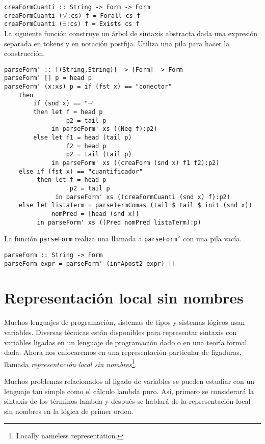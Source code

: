 \documentclass{article}
\begin{document}
\texttt{creaFormCuanti :: String -> Form -> Form}\\
\texttt{creaFormCuanti ($\forall$:cs) f = Forall cs f}\\
\texttt{creaFormCuanti ($\exists$:cs) f = Exists cs f}\\

La siguiente función construye un árbol de sintaxis abstracta dada una expresión separada en tokens y en notación postfija. Utiliza una pila para hacer la construcción.

\begin{verbatim}
parseForm' :: [(String,String)] -> [Form] -> Form
parseForm' [] p = head p
parseForm' (x:xs) p = if (fst x) == "conector"
    then
        if (snd x) == "¬"
        then let f = head p
                 p2 = tail p
             in parseForm' xs ((Neg f):p2)
        else let f1 = head (tail p)
                 f2 = head p
                 p2 = tail (tail p)
             in parseForm' xs ((creaForm (snd x) f1 f2):p2)
    else if (fst x) == "cuantificador"
         then let f = head p
                  p2 = tail p
              in parseForm' xs ((creaFormCuanti (snd x) f):p2)
    else let listaTerm = parseTermComas (tail $ tail $ init (snd x))
             nomPred = [head (snd x)]
         in parseForm' xs ((Pred nomPred listaTerm):p)
\end{verbatim}

La función \texttt{parseForm} realiza una llamada a \texttt{parseForm'} con una pila vacía.

\begin{verbatim}
parseForm :: String -> Form
parseForm expr = parseForm' (infApost2 expr) []
\end{verbatim}

\section{Representación local sin nombres}

Muchos lenguajes de programación, sistemas de tipos y sistemas lógicos usan variables. Diversas técnicas están disponibles para representar sintaxis con variables ligadas en un lenguaje de programación dado o en una teoría formal dada. Ahora nos enfocaremos en una representación particular de ligaduras, llamada \textit{representación local sin nombres}\footnote{Locally nameless representation.}.

Muchos problemas relacionados al ligado de variables se pueden estudiar con un lenguaje tan simple como el cálculo lambda puro. Así, primero se considerará la sintaxis de los términos lambda y después se hablará de la representación local sin nombres en la lógica de primer orden.
\end{document}
